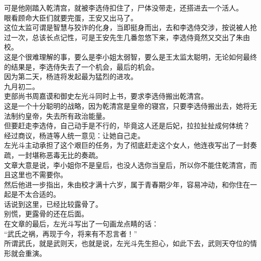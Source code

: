 \begin{multicols}{\theparacolNo}
可是他刚踏入乾清宫，就被李选侍扣住了，尸体没带走，还搭进去一个活人。\\

眼看顾命大臣们就要完蛋，王安又出马了。\\

这位太监可谓是智慧与狡诈的化身，当即挺身而出，去和李选侍交涉，按说被人抢过一次，总该长点记性，可是王安先生几番忽悠下来，李选侍竟然又交出了朱由校。\\

这是个很难理解的事，要么是李小姐太弱智，要么是王太监太聪明，无论如何最终的结果是，李选侍失去了一个机会，最后的机会。\\

因为第二天，杨涟将发起最为猛烈的进攻。\\

九月初二。\\

吏部尚书周嘉谟和御史左光斗同时上书，要求李选侍搬出乾清宫。\\

这是一个十分聪明的战略，因为乾清宫是皇帝的寝宫，只要李选侍搬出去，她将无法制约皇帝，失去所有政治能量。\\

但要赶走李选侍，自己动手是不行的，毕竟这人还是后妃，拉拉扯扯成何体统？\\

经过商议，杨涟等人统一意见：让她自己走。\\

左光斗主动承担了这个艰巨的任务，为了彻底赶走这个女人，他连夜写出了一封奏疏，一封堪称恶毒无比的奏疏。\\

文章大意是说，李小姐你不是皇后，也没人选你当皇后，所以你不能住乾清宫，而且这里也不需要你。\\

然后他进一步指出，朱由校才满十六岁，属于青春期少年，容易冲动，和你住在一起是不太合适的。\\

话说到这里，已经比较露骨了。\\

别慌，更露骨的还在后面。\\

在文章的最后，左光斗写出了一句画龙点睛的话：\\

“武氏之祸，再现于今，将来有不忍言者！”\\

所谓武氏，就是武则天，也就是说，左光斗先生担心，如此下去，武则天夺位的情形就会重演。\\


\end{multicols}
